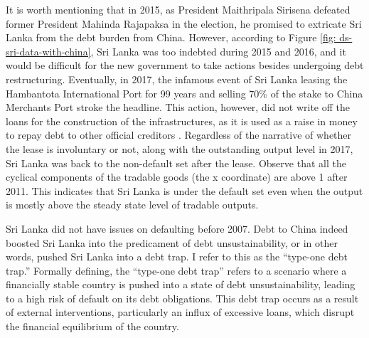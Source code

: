 It is worth mentioning that in 2015, as President Maithripala Sirisena defeated former President Mahinda Rajapaksa in the election, he promised to extricate Sri Lanka from the debt burden from China. However, according to Figure \ref{fig: ds-sri-data-with-china}, Sri Lanka was too indebted during 2015 and 2016, and it would be difficult for the new government to take actions besides undergoing debt restructuring. Eventually, in 2017, the infamous event of Sri Lanka leasing the Hambantota International Port for 99 years and selling 70\% of the stake to China Merchants Port stroke the headline. This action, however, did not write off the loans for the construction of the infrastructures, as it is used as a raise in money to repay debt to other official creditors \citep{Brautigam-meme-2020, Moramudali_2019}. Regardless of the narrative of whether the lease is involuntary or not, along with the outstanding output level in 2017, Sri Lanka was back to the non-default set after the lease.
Observe that all the cyclical components of the tradable goods (the x coordinate) are above 1 after 2011. This indicates that Sri Lanka is under the default set even when the output is mostly above the steady state level of tradable outputs.

Sri Lanka did not have issues on defaulting before 2007. Debt to China indeed boosted Sri Lanka into the predicament of debt unsustainability, or in other words, pushed Sri Lanka into a debt trap. I refer to this as the ``type-one debt trap.'' Formally defining, the ``type-one debt trap'' refers to a scenario where a financially stable country is pushed into a state of debt unsustainability, leading to a high risk of default on its debt obligations. This debt trap occurs as a result of external interventions, particularly an influx of excessive loans, which disrupt the financial equilibrium of the country.


